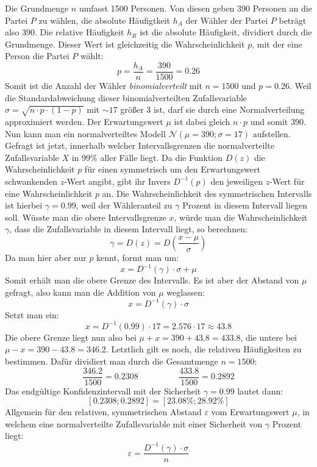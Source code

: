 Die Grundmenge $n$ umfasst 1500 Personen. Von diesen geben 390 Personen an die Partei $P$ zu w\"{a}hlen, die absolute H\"{a}ufigtkeit $h_A$ der W\"{a}hler der Partei $P$ betr\"{a}gt also 390. Die relative H\"{a}ufigkeit $h_R$ ist die absolute H\"{a}ufigkeit, dividiert durch die Grundmenge. Dieser Wert ist gleichzeitig die Wahrscheinlichkeit $p$, mit der eine Person die Partei $P$ w\"{a}hlt: $$p = \frac{h_A}{n} = \frac{390}{1500} = 0.26$$ Somit ist die Anzahl der W\"{a}hler \emph{binomialverteilt} mit $n=1500$ und $p=0.26$. Weil die Standardabweichung dieser binomialverteilten Zufallsvariable $\sigma = \sqrt{n \cdot p \cdot (1 - p)}$ mit $\sim 17$ gr\"{o}\ss{}er 3 ist, darf sie durch eine Normalverteilung approximiert werden. Der Erwartungswert $\mu$ ist dabei gleich $n \cdot p$ und somit 390. Nun kann man ein normalverteiltes Modell $\mathcal{N}(\mu=390; \sigma=17)$ aufstellen. Gefragt ist jetzt, innerhalb welcher Intervallsgrenzen die normalverteilte Zufallsvariable $X$ in $99\%$ aller F\"{a}lle liegt. Da die Funktion $D(z)$ die Wahrscheinlichkeit $p$ f\"{u}r einen symmetrisch um den Erwartungswert schwankenden $z$-Wert angibt, gibt ihr Invers $D^{-1}(p)$ den jeweiligen $z$-Wert f\"{u}r eine Wahrscheinlichkeit $p$ an. Die Wahrscheinlichkeit des symmetrischen Intervalls ist hierbei $\gamma = 0.99$, weil der W\"{a}hleranteil zu $\gamma$ Prozent in diesem Intervall liegen soll. W\"{u}sste man die obere Intervallsgrenze $x$, w\"{u}rde man die Wahrscheinlichkeit $\gamma$, dass die Zufallsvariable in diesem Intervall liegt, so berechnen: $$\gamma = D(z) = D(\frac{x - \mu}{\sigma})$$ Da man hier aber nur $p$ kennt, formt man um: $$x = D^{-1}(\gamma) \cdot \sigma + \mu$$ Somit erh\"{a}lt man die obere Grenze des Intervalls. Es ist aber der Abstand von $\mu$ gefragt, also kann man die Addition von $\mu$ weglassen: $$x = D^{-1}(\gamma) \cdot \sigma$$ Setzt man ein: $$x = D^{-1}(0.99) \cdot 17 = 2.576 \cdot 17 \approx 43.8$$ Die obere Grenze liegt nun also bei $\mu + x = 390 + 43.8 = 433.8$, die untere bei $\mu - x = 390 - 43.8 = 346.2$. Letztlich gilt es noch, die relativen H\"{a}ufigkeiten zu bestimmen. Daf\"{u}r dividiert man durch die Gesamtmenge $n = 1500$: $$\frac{346.2}{1500} = 0.2308 \hspace{2cm} \frac{433.8}{1500} = 0.2892$$ Das endg\"{u}ltige Konfidenzintervall mit der Sicherheit $\gamma = 0.99$ lautet dann: $$[0.2308; 0.2892] = [23.08\% ; 28.92\%]$$ Allgemein f\"{u}r den relativen, symmetrischen Abstand $\varepsilon$ vom Erwartungswert $\mu$, in welchem eine normalverteilte Zufallsvariable mit einer Sicherheit von $\gamma$ Prozent liegt: $$\varepsilon = \frac{D^{-1}(\gamma) \cdot \sigma}{n}$$

